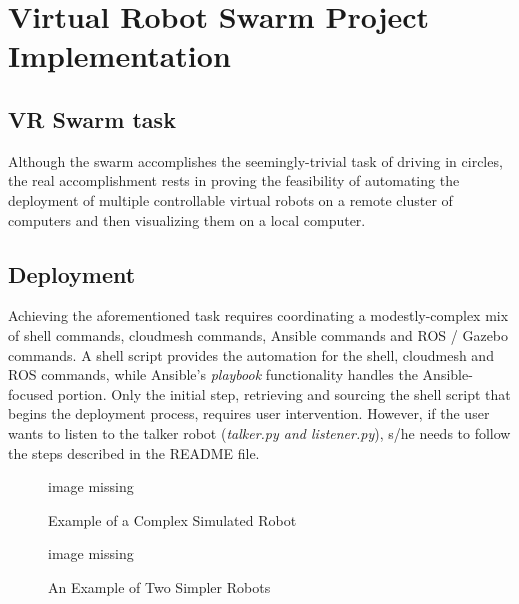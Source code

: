 \documentclass[9pt,twocolumn,twoside]{../../styles/osajnl}
\begin{document}
\section{Virtual Robot Swarm Project Implementation}
\subsection{VR Swarm task}

Although the swarm accomplishes the seemingly-trivial task of driving in circles, the real accomplishment rests in proving the feasibility of automating the deployment of multiple controllable virtual robots on a remote cluster of computers and then visualizing them on a local computer.

\subsection{Deployment}
Achieving the aforementioned task requires coordinating a modestly-complex mix of shell commands, cloudmesh commands, Ansible commands and ROS / Gazebo commands. A shell script provides the automation for the shell, cloudmesh and ROS commands, while Ansible's \textit{playbook} functionality handles the Ansible-focused portion.  Only the initial step, retrieving and sourcing the shell script that begins the deployment process, requires user intervention.  However, if the user wants to listen to the talker robot (\textit{talker.py and listener.py}), s/he needs to follow the steps described in the README file.

\begin{figure}[htbp]
\centering
image missing
\caption{Example of a Complex Simulated Robot}
\label{fig:complexRobot}
\end{figure}

\begin{figure}[htbp]
\centering
image missing
\caption{An Example of Two Simpler Robots}
\label{fig:simplerRobots}
\end{figure}
\end{document}
